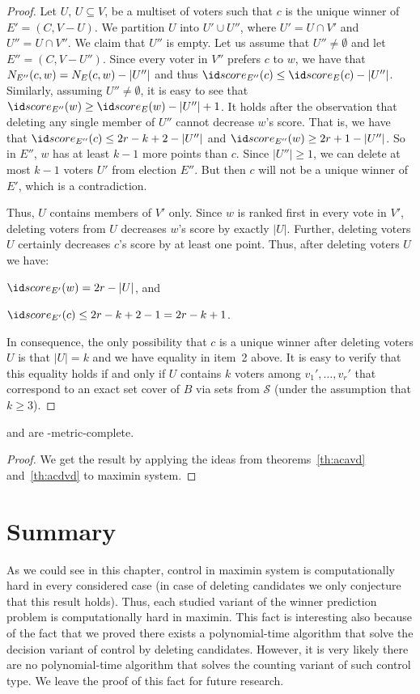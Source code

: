 \begin{proof}
Let $U$, $U\subseteq V$, be a multiset of voters such that $c$ is the unique winner of $E'=(C,V-U)$.
We partition $U$ into $U'\cup U''$, where $U'=U\cap V'$ and $U''=U\cap V''$.
We claim that $U''$ is empty.
Let us assume that $U''\ne\emptyset$ and let $E''=(C,V-U'')$.
Since every voter in $V''$ prefers $c$ to $w$, we have that $N_{E''}(c,w)=N_{E}(c,w)-|U''|$ and thus $\score{E''}(c)\le\score{E}(c)-|U''|$.
Similarly, assuming $U''\ne\emptyset$, it is easy to see that $\score{E''}(w)\ge\score{E}(w)-|U''|+1$.
It holds after the observation that deleting any single member of $U''$ cannot decrease $w$'s score.
That is, we have that $\score{E''}(c)\le2r-k+2-|U''|$ and $\score{E''}(w)\ge2r+1-|U''|$.
So in $E''$, $w$ has at least $k-1$ more points than $c$.
Since $|U''|\ge1$, we can delete at most $k-1$ voters $U'$ from election $E''$.
But then $c$ will not be a unique winner of $E'$, which is a contradiction.

Thus, $U$ contains members of $V'$ only.
Since $w$ is ranked first in every vote in $V'$, deleting voters from $U$ decreases $w$'s score by exactly $|U|$.
Further, deleting voters $U$ certainly decreases $c$'s score by at least one point.
Thus, after deleting voters $U$ we have:
\begin{Enumerate}
	\item $\score{E'}(w)=2r-|U|$, and
	\item $\score{E'}(c)\le2r-k+2-1=2r-k+1$.
\end{Enumerate}
In consequence, the only possibility that $c$ is a unique winner after deleting voters $U$ is that $|U|=k$ and we have equality in item~2 above.
It is easy to verify that this equality holds if and only if $U$ contains $k$ voters among $v_1',\dots,v_r'$ that correspond to an exact set cover of $B$ via sets from $\mathcal{S}$ (under the assumption that $k\ge3$).
\end{proof}

\begin{theorem} \label{th:mmadvd}
	 and  are \sharpPclass-me\-tric-complete.
\end{theorem}

\begin{proof}
We get the result by applying the ideas from theorems~\ref{th:acavd} and~\ref{th:acdvd} to maximin system.
\end{proof}

\section{Summary} \label{sec:mmsum}

As we could see in this chapter, control in maximin system is computationally hard in every considered case (in case of deleting candidates we only conjecture that this result holds).
Thus, each studied variant of the winner prediction problem is computationally hard in maximin.
This fact is interesting also because of the fact that we proved there exists a polynomial-time algorithm that solve the decision variant of control by deleting candidates.
However, it is very likely there are no polynomial-time algorithm that solves the counting variant of such control type.
We leave the proof of this fact for future research.
